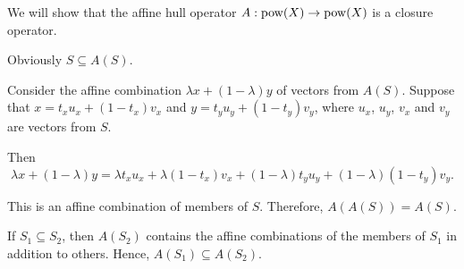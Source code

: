 \begin{defproof}
  We will show that the affine hull operator \( A: \operatorname{pow}(X) \to \operatorname{pow}(X) \) is a closure operator.

   Obviously \( S \subseteq A(S) \).

   Consider the affine combination \( \lambda x + (1 - \lambda) y \) of vectors from \( A(S) \). Suppose that \( x = t_x u_x + (1 - t_x) v_x \) and \( y = t_y u_y + (1 - t_y) v_y \), where \( u_x \), \( u_y \), \( v_x \) and \( v_y \) are vectors from \( S \).

  Then
  \begin{equation*}
    \lambda x + (1 - \lambda) y
    =
    \lambda t_x u_x + \lambda (1 - t_x) v_x + (1 - \lambda) t_y u_y + (1 - \lambda) (1 - t_y) v_y.
  \end{equation*}

  This is an affine combination of members of \( S \). Therefore, \( A(A(S)) = A(S) \).

   If \( S_1 \subseteq S_2 \), then \( A(S_2) \) contains the affine combinations of the members of \( S_1 \) in addition to others. Hence, \( A(S_1) \subseteq A(S_2) \).
\end{defproof}

